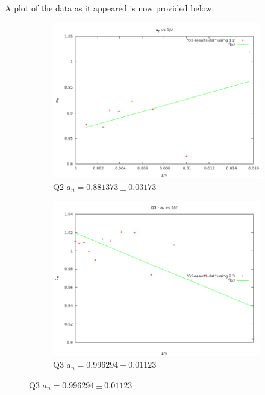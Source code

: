 A plot of the data as it appeared is now provided below.

\begin{figure}[H]
\centering
\begin{subfigure}[b]{0.45\textwidth}
    \includegraphics[width=\textwidth]{4-Results/Q2-Verification.png}
    \caption{Q2 $a_n = 0.881373 \pm 0.03173$}
\end{subfigure}
\begin{subfigure}[b]{0.45\textwidth}
    \includegraphics[width=\textwidth]{4-Results/Q3-Verification.png}
    \caption{Q3 $a_n = 0.996294 \pm 0.01123$}
\end{subfigure}


\end{figure}
